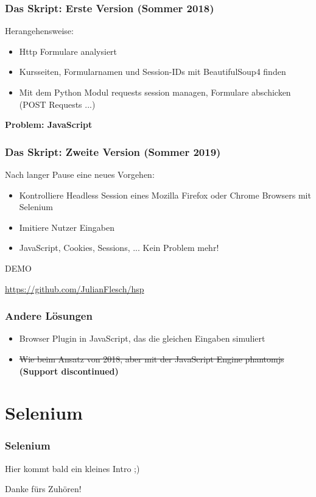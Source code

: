 \documentclass{beamer}
\begin{document}
	\begin{frame}
		\frametitle{Das Skript: Erste Version (Sommer 2018)}
		Herangehensweise:
		\begin{itemize}
			\item Http Formulare analysiert
			\item Kursseiten, Formularnamen und Session-IDs mit BeautifulSoup4 finden
			\item Mit dem Python Modul requests session managen, Formulare abschicken (POST Requests ...)
		\end{itemize}
		
		\vspace{2em}
		{\centering \Large \textbf{Problem: JavaScript}}
	\end{frame}
	
	\begin{frame}
		\frametitle{Das Skript: Zweite Version (Sommer 2019)}
		Nach langer Pause eine neues Vorgehen:
		\begin{itemize}
			\item Kontrolliere Headless Session eines Mozilla Firefox oder Chrome Browsers mit Selenium
			\item Imitiere Nutzer Eingaben
			\item JavaScript, Cookies, Sessions, ... Kein Problem mehr!
		\end{itemize}
	\end{frame}

	\begin{frame}
	\centering
	{\Huge DEMO} 
	
	\vspace{2em}
	
	\url{https://github.com/JulianFlesch/hsp}
	\end{frame}
	
	\begin{frame}
	\frametitle{Andere Lösungen}
	\begin{itemize}
		\item Browser Plugin in JavaScript, das die gleichen Eingaben simuliert
		\item \sout{Wie beim Ansatz von 2018, aber mit der JavaScript Engine phantomjs} \textbf{(Support discontinued)}
	\end{itemize}
	\end{frame}

	\section{Selenium}
	\begin{frame}
	\frametitle{Selenium}
	Hier kommt bald ein kleines Intro ;) 
	\end{frame}

	\begin{frame}
	\centering
	{\Huge Danke fürs Zuhören!} 
	\end{frame}
\end{document}
